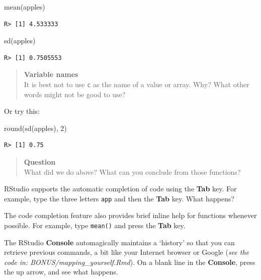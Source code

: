 \documentclass[
]{book}
\newenvironment{Shaded}{\begin{snugshade}}{\end{snugshade}}
\newcommand{\DecValTok}[1]{\textcolor[rgb]{0.00,0.00,0.81}{#1}}
\newcommand{\FunctionTok}[1]{\textcolor[rgb]{0.00,0.00,0.00}{#1}}
\newcommand{\NormalTok}[1]{#1}
\begin{document}
\begin{Shaded}
\begin{Highlighting}[]
\FunctionTok{mean}\NormalTok{(apples)}
\end{Highlighting}
\end{Shaded}

\begin{verbatim}
R> [1] 4.533333
\end{verbatim}

\begin{Shaded}
\begin{Highlighting}[]
\FunctionTok{sd}\NormalTok{(apples)}
\end{Highlighting}
\end{Shaded}

\begin{verbatim}
R> [1] 0.7505553
\end{verbatim}

\begin{quote}
\textbf{Variable names}\\
It is best not to use \texttt{c} as the name of a value or array. Why? What other words might not be good to use?
\end{quote}

Or try this:

\begin{Shaded}
\begin{Highlighting}[]
\FunctionTok{round}\NormalTok{(}\FunctionTok{sd}\NormalTok{(apples), }\DecValTok{2}\NormalTok{)}
\end{Highlighting}
\end{Shaded}

\begin{verbatim}
R> [1] 0.75
\end{verbatim}

\begin{quote}
\textbf{Question}\\
What did we do above? What can you conclude from those functions?
\end{quote}

RStudio supports the automatic completion of code using the \textbf{Tab} key. For example, type the three letters \texttt{app} and then the \textbf{Tab} key. What happens?

The code completion feature also provides brief inline help for functions whenever possible. For example, type \texttt{mean()} and press the \textbf{Tab} key.

The RStudio \textbf{Console} automagically maintains a `history' so that you can retrieve previous commands, a bit like your Internet browser or Google (\emph{see the code in: BONUS/mapping\_yourself.Rmd}). On a blank line in the \textbf{Console}, press the up arrow, and see what happens.
\end{document}
